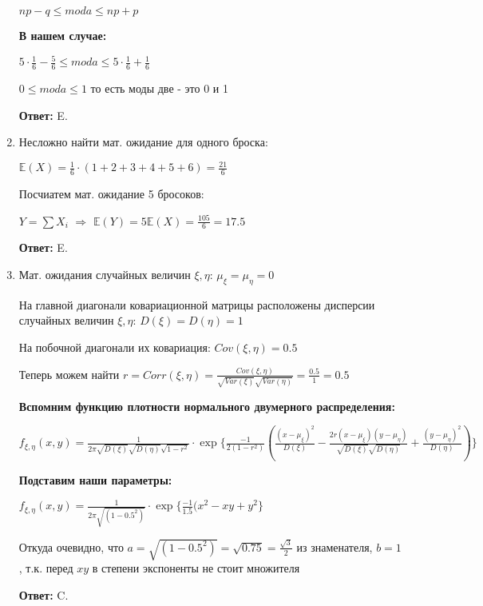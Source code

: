 \documentclass[a4paper]{article} %
\begin{document}
\begin{enumerate}
    $np-q \leq moda \leq np+p$
    
    \textbf{В нашем случае:}
    
    $5 \cdot \frac{1}{6} - \frac{5}{6} \leq moda \leq 5 \cdot \frac{1}{6} + \frac{1}{6}$
    
    $0 \leq moda \leq 1$ то есть моды две - это 0 и 1
    
    \textbf{Ответ:} E.
    
    
    
    \item
    Несложно найти мат. ожидание для одного броска:
    
    $\mathbb{E}(X) = \frac{1}{6}\cdot(1 + 2 + 3 + 4 + 5 + 6) = \frac{21}{6}$
    
    Посчиатем мат. ожидание 5 бросоков:

    $Y = \sum X_i$ $\Rightarrow$ $\mathbb{E}(Y) = 5\mathbb{E}(X) = \frac{105}{6} = 17.5$
    
    \textbf{Ответ:} E.
    
    
    
    \item
    Мат. ожидания случайных величин $\xi, \eta $: $\mu_\xi = \mu_\eta = 0$
    
    На главной диагонали ковариационной матрицы расположены дисперсии случайных величин $\xi, \eta $: $D(\xi) = D(\eta) = 1$
    
    На побочной диагонали их ковариация: $Cov(\xi, \eta) = 0.5$
    
    Теперь можем найти $r = Corr(\xi, \eta) = \frac{Cov(\xi, \eta)}{\sqrt{Var(\xi)}\sqrt{Var(\eta)}} = \frac{0.5}{1} = 0.5$
    
    \textbf{Вспомним функцию плотности нормального двумерного распределения:}
    
    $f_{\xi, \eta}(x,y) = \frac{1}{2\pi\sqrt{D(\xi)}\sqrt{D(\eta)}\sqrt{1-r^2}}\cdot \exp{\{\frac{-1}{2(1-r^2)}(\frac{(x-\mu_\xi)^2}{D(\xi)}-\frac{2r(x-\mu_\xi)(y-\mu_\eta)}{\sqrt{D(\xi)}\sqrt{D(\eta)}}+\frac{(y-\mu_\eta)^2}{D(\eta)})\}}$
    
    \textbf{Подставим наши параметры:}
    
    $f_{\xi, \eta}(x,y) = \frac{1}{2\pi\sqrt{(1-0.5^2)}}\cdot \exp{\{\frac{-1}{1.5}(x^2-xy+y^2\}}$
    
    Откуда очевидно, что $a = \sqrt{(1-0.5^2)} = \sqrt{0.75} = \frac{\sqrt{3}}{2}$ из знаменателя, $b=1$, т.к. перед $xy$ в степени экспоненты не стоит множителя
    
    \textbf{Ответ:} C.
    

\end{enumerate}
\end{document}
